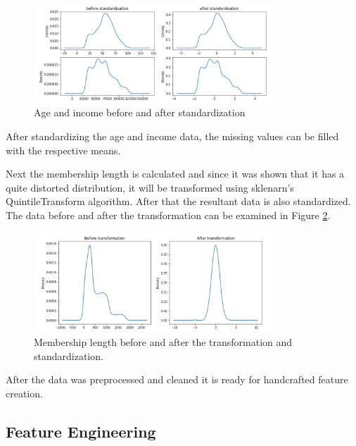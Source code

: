 \begin{figure}[h]
	\centering
	\includegraphics[width=0.8\textwidth]{fig/age_before_after.jpg}
	\vspace*{-0.1in}
	\caption{Age and income before and after standardization}
	\label{fig9}
	\vspace*{-0.2in}
	\bigskip
\end{figure}

After standardizing the age and income data, the missing values can be filled with the respective means. 

Next the membership length is calculated and since it was shown that it has a quite distorted distribution, it will be transformed using sklenarn's QuintileTransform algorithm. After that the resultant data is also standardized. The data before and after the transformation can be examined in Figure \ref{fig10}.

\begin{figure}[h]
	\centering
	\includegraphics[width=0.8\textwidth]{fig/membership_before_after.jpg}
	\vspace*{-0.1in}
	\caption{Membership length before and after the transformation and standardization.}
	\label{fig10}
	\vspace*{-0.2in}
	\bigskip
\end{figure}

After the data was preprocessed and cleaned it is ready for handcrafted feature creation.

\subsection{Feature Engineering} \label{sec3.3}

